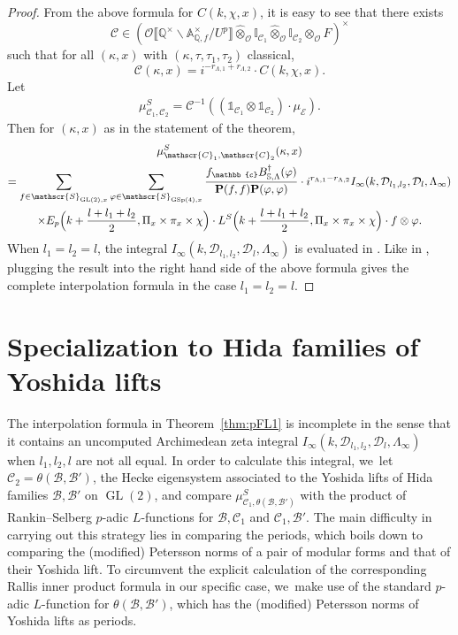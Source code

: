 \documentclass[JEP,XML,SOM,Unicode,published]{cedram}
\newcommand{\Lfunction}{$L$\nobreakdash-func\-tion\xspace}
\newcommand{\Lfunctions}{$L$\nobreakdash-func\-tions\xspace}
\theoremstyle{plain}
\theoremstyle{remark}
\newcommand{\bA}{\mathbb{A}}
\newcommand{\bI}{\mathbb{I}}
\newcommand{\bQ}{\mathbb{Q}}
\newcommand{\bS}{\mathbb{S}}
\newcommand{\bbc}{\mathbb{c}}
\newcommand{\cC}{\mathcal{C}}
\newcommand{\cD}{\mathcal{D}}
\newcommand{\cE}{\mathcal{E}}
\newcommand{\cO}{\mathcal{O}}
\newcommand{\sB}{\mathscr{B}}
\newcommand{\sC}{\mathscr{C}}
\newcommand{\sS}{\mathscr{S}}
\newcommand{\bfP}{\mathbf{P}}
\DeclareMathOperator{\GL}{GL}
\DeclareMathOperator{\GSp}{GSp}
\let\bes B
\let\llb\llbracket
\let\rrb\rrbracket
\newcommand{\sLambda}{\scriptscriptstyle{\Lambda}}
\begin{document}
\begin{proof}
From the above formula for $C(k,\chi,x)$, it is easy to see that there exists
\[
\cC\in \left(\cO\llb \bQ^\times\backslash\bA^\times_{\bQ,f}/U^p\rrb \hat{\otimes}_{\cO} \bI_{\sC_1}\hat{\otimes}_\cO \bI_{\sC_2}\otimes_\cO F\right)^\times
\]
such that for all $(\kappa,x)$ with $(\kappa,\tau,\tau_1,\tau_2)$ classical,
\[
\cC(\kappa,x)=i^{-r_{\sLambda,1}+r_{\sLambda,2}}\cdot C(k,\chi,x).
\]
Let
\begin{align*}
\mu^S_{\sC_1,\sC_2}= \cC^{-1}\left((\mathds{1}_{\sC_1}\otimes \mathds{1}_{\sC_2})\cdot \mu_{\cE}\right).
\end{align*}
Then for $(\kappa,x)$ as in the statement of the theorem,
\begin{multline*}
\mu^S_{\sC_1,\sC_2}(\kappa,x)\\
=\sum_{f\in \sS_{\GL(2),x}}\sum_{\varphi\in \sS_{\GSp(4),x}}
\frac{f_\bbc \bes^\dagger_{\bS,\Lambda}(\varphi)}{\bfP(f,f)\bfP(\varphi,\varphi)}
\cdot i^{r_{\sLambda,1}-r_{\sLambda,2}}I_\infty(k,\cD_{l_1,l_2},\cD_l,\Lambda_\infty)\\
\times E_p\Bigl(k+\frac{l+l_1+l_2}{2},\Pi_x\times\pi_x\times \chi\Bigr)\cdot L^S\Bigl(k+\frac{l+l_1+l_2}{2},\Pi_x\times\pi_x\times \chi\Bigr)
\cdot f\otimes\varphi.
\end{multline*}
When $l_1=l_2=l$, the integral $I_\infty(k,\cD_{l_1,l_2},\cD_l,\Lambda_\infty)$ is evaluated in \cite[Prop.\,4.2]{pFL}. Like in \loccit, plugging the result into the right hand side of the above formula gives the complete interpolation formula in the case $l_1=l_2=l$.
\end{proof}

\section{Specialization to Hida families of Yoshida lifts}
The interpolation formula in Theorem~\ref{thm:pFL1} is incomplete in the sense that it contains an uncomputed Archimedean zeta integral $I_\infty(k,\cD_{l_1,l_2},\cD_l,\Lambda_\infty)$ when $l_1,l_2,l$ are not all equal. In order to calculate this integral, we~let $\sC_2=\theta(\sB,\sB')$, the Hecke eigensystem associated to the Yoshida lifts of Hida families $\sB,\sB'$ on $\GL(2)$, and compare $\mu^S_{\sC_1,\theta(\sB,\sB')}$ with the product of Rankin--Selberg $p$-adic \Lfunctions for $\sB,\sC_1$ and $\sC_1,\sB'$. The main difficulty in carrying out this strategy lies in comparing the periods, which boils down to comparing the (modified) Petersson norms of a pair of modular forms and that of their Yoshida lift. To circumvent the explicit calculation of the corresponding Rallis inner product formula in our specific case, we~make use of the standard $p$-adic \Lfunction for $\theta(\sB,\sB')$, which has the (modified) Petersson norms of Yoshida lifts as periods.
\end{document}

